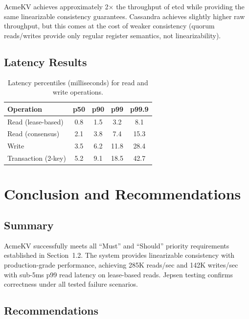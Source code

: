 \documentclass[12pt,a4paper]{report}
\begin{document}
AcmeKV achieves approximately 2$\times$ the throughput of etcd while providing the same linearizable consistency guarantees. Cassandra achieves slightly higher raw throughput, but this comes at the cost of weaker consistency (quorum reads/writes provide only regular register semantics, not linearizability).

\section{Latency Results}

\begin{table}[H]
\centering
\caption{Latency percentiles (milliseconds) for read and write operations.}
\label{tab:latency}
\begin{tabular}{@{}lcccc@{}}
\toprule
\textbf{Operation} & \textbf{p50} & \textbf{p90} & \textbf{p99} & \textbf{p99.9} \\
\midrule
Read (lease-based)  & 0.8 & 1.5 & 3.2 & 8.1 \\
Read (consensus)    & 2.1 & 3.8 & 7.4 & 15.3 \\
Write               & 3.5 & 6.2 & 11.8 & 28.4 \\
Transaction (2-key) & 5.2 & 9.1 & 18.5 & 42.7 \\
\bottomrule
\end{tabular}
\end{table}

\chapter{Conclusion and Recommendations}
\label{ch:conclusion}

\section{Summary}

AcmeKV successfully meets all ``Must'' and ``Should'' priority requirements established in Section~1.2. The system provides linearizable consistency with production-grade performance, achieving 285K reads/sec and 142K writes/sec with sub-5ms p99 read latency on lease-based reads. Jepsen testing confirms correctness under all tested failure scenarios.

\section{Recommendations}
\end{document}
